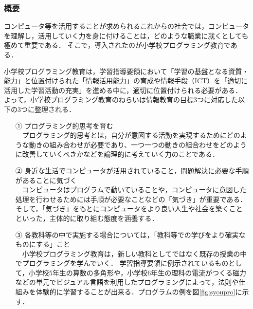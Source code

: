 \documentclass[12pt,a4j,titlepage]{ltjsarticle}
\begin{document}
\subsubsection{概要}
コンピュータ等を活用することが求められるこれからの社会では，コンピュータを理解し，活用していく力を身に付けることは，どのような職業に就くとしても極めて重要である．
そこで，導入されたのが小学校プログラミング教育である\cite{syogaku_pro}．

小学校プログラミング教育は，学習指導要領において「学習の基盤となる資質・能力」と位置付けられた「情報活用能力」の育成や情報手段（ICT）を「適切に活用した学習活動の充実」を進める中に，適切に位置付けられる必要がある．
よって，小学校プログラミング教育のねらいは情報教育の目標3つに対応した以下の3つに整理される．
\begin{enumerate}

\item[①] プログラミング的思考を育む\mbox{}\\
　プログラミング的思考とは，自分が意図する活動を実現するためにどのような動きの組み合わせが必要であり、一つ一つの動きの組合わせをどのように改善していくべきかなどを論理的に考えていく力のことである．

\item[➁] 身近な生活でコンピュータが活用されていること，問題解決に必要な手順があることに気づく\mbox{}\\
　コンピュータはプログラムで動いていることや，コンピュータに意図した処理を行わせるためには手順が必要なことなどの「気づき」が重要である．
そして，「気づき」をもとにコンピュータをより良い人生や社会を築くことといった，主体的に取り組む態度を涵養する．

\item[③] 各教科等の中で実施する場合については，「教科等での学びをより確実なものにする」こと\mbox{}\\
　小学校プログラミング教育は，新しい教科としてではなく既存の授業の中でプログラミングを学んでいく．
学習指導要領に例示されているものとして，小学校5年生の算数の多角形や，小学校6年生の理科の電流がつくる磁力などの単元でビジュアル言語を利用したプログラミングによって，法則や仕組みを体験的に学習することが出来る\cite{syogaku_jirei}．プログラムの例を図\ref{fig:syoupro}に示す．
\end{enumerate}

\clearpage
\end{document}
